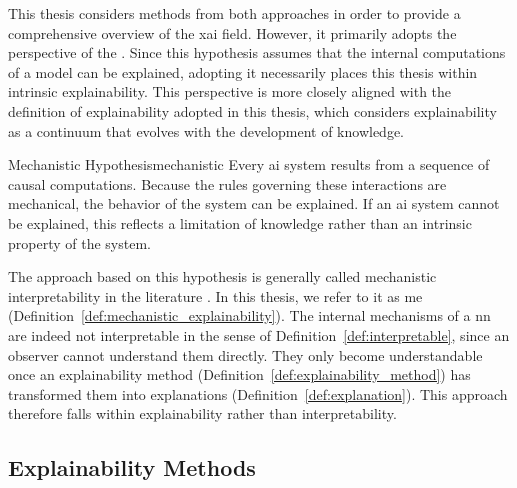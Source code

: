 This thesis considers methods from both approaches in order to provide a comprehensive overview of the \gls{xai} field.
However, it primarily adopts the perspective of the \MechanisticHypothesisName \parencite{Siegel_Craver_2024, zednik2019solving}.
Since this hypothesis assumes that the internal computations of a model can be explained, adopting it necessarily places this thesis within intrinsic explainability.
This perspective is more closely aligned with the definition of explainability adopted in this thesis, which considers explainability as a continuum that evolves with the development of knowledge.

\begin{hypothesis}{Mechanistic Hypothesis}{mechanistic}
Every \gls{ai} system results from a sequence of causal computations.
Because the rules governing these interactions are mechanical, the behavior of the system can be explained.
If an \gls{ai} system cannot be explained, this reflects a limitation of knowledge rather than an intrinsic property of the system.
\end{hypothesis}

The approach based on this hypothesis is generally called mechanistic interpretability in the literature \parencite{olah2020zoom}.
In this thesis, we refer to it as \gls{me} (Definition~\ref{def:mechanistic_explainability}).
The internal mechanisms of a \gls{nn} are indeed not interpretable in the sense of Definition~\ref{def:interpretable}, since an observer cannot understand them directly.
They only become understandable once an explainability method (Definition~\ref{def:explainability_method}) has transformed them into explanations (Definition~\ref{def:explanation}).
This approach therefore falls within explainability rather than interpretability.

\subsection{Explainability Methods}
\label{subsec:explainability_method}

